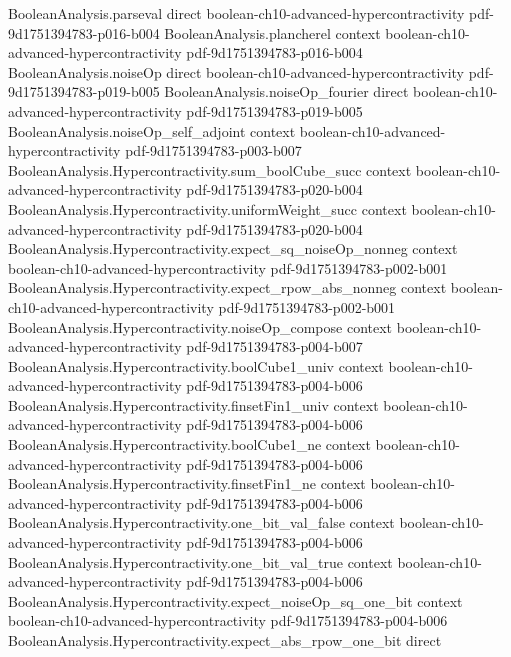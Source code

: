 \begin{theorem}
  {BooleanAnalysis.parseval}
  {direct}
  {boolean-ch10-advanced-hypercontractivity}
  {pdf-9d1751394783-p016-b004}
\proofstep
  {BooleanAnalysis.plancherel}
  {context}
  {boolean-ch10-advanced-hypercontractivity}
  {pdf-9d1751394783-p016-b004}
\proofstep
  {BooleanAnalysis.noiseOp}
  {direct}
  {boolean-ch10-advanced-hypercontractivity}
  {pdf-9d1751394783-p019-b005}
\proofstep
  {BooleanAnalysis.noiseOp_fourier}
  {direct}
  {boolean-ch10-advanced-hypercontractivity}
  {pdf-9d1751394783-p019-b005}
\proofstep
  {BooleanAnalysis.noiseOp_self_adjoint}
  {context}
  {boolean-ch10-advanced-hypercontractivity}
  {pdf-9d1751394783-p003-b007}
\proofstep
  {BooleanAnalysis.Hypercontractivity.sum_boolCube_succ}
  {context}
  {boolean-ch10-advanced-hypercontractivity}
  {pdf-9d1751394783-p020-b004}
\proofstep
  {BooleanAnalysis.Hypercontractivity.uniformWeight_succ}
  {context}
  {boolean-ch10-advanced-hypercontractivity}
  {pdf-9d1751394783-p020-b004}
\proofstep
  {BooleanAnalysis.Hypercontractivity.expect_sq_noiseOp_nonneg}
  {context}
  {boolean-ch10-advanced-hypercontractivity}
  {pdf-9d1751394783-p002-b001}
\proofstep
  {BooleanAnalysis.Hypercontractivity.expect_rpow_abs_nonneg}
  {context}
  {boolean-ch10-advanced-hypercontractivity}
  {pdf-9d1751394783-p002-b001}
\proofstep
  {BooleanAnalysis.Hypercontractivity.noiseOp_compose}
  {context}
  {boolean-ch10-advanced-hypercontractivity}
  {pdf-9d1751394783-p004-b007}
\proofstep
  {BooleanAnalysis.Hypercontractivity.boolCube1_univ}
  {context}
  {boolean-ch10-advanced-hypercontractivity}
  {pdf-9d1751394783-p004-b006}
\proofstep
  {BooleanAnalysis.Hypercontractivity.finsetFin1_univ}
  {context}
  {boolean-ch10-advanced-hypercontractivity}
  {pdf-9d1751394783-p004-b006}
\proofstep
  {BooleanAnalysis.Hypercontractivity.boolCube1_ne}
  {context}
  {boolean-ch10-advanced-hypercontractivity}
  {pdf-9d1751394783-p004-b006}
\proofstep
  {BooleanAnalysis.Hypercontractivity.finsetFin1_ne}
  {context}
  {boolean-ch10-advanced-hypercontractivity}
  {pdf-9d1751394783-p004-b006}
\proofstep
  {BooleanAnalysis.Hypercontractivity.one_bit_val_false}
  {context}
  {boolean-ch10-advanced-hypercontractivity}
  {pdf-9d1751394783-p004-b006}
\proofstep
  {BooleanAnalysis.Hypercontractivity.one_bit_val_true}
  {context}
  {boolean-ch10-advanced-hypercontractivity}
  {pdf-9d1751394783-p004-b006}
\proofstep
  {BooleanAnalysis.Hypercontractivity.expect_noiseOp_sq_one_bit}
  {context}
  {boolean-ch10-advanced-hypercontractivity}
  {pdf-9d1751394783-p004-b006}
\proofstep
  {BooleanAnalysis.Hypercontractivity.expect_abs_rpow_one_bit}
  {direct}

\end{theorem}
